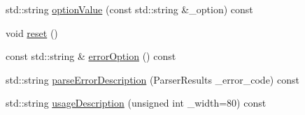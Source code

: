 \begin{DoxyCompactItemize}
$$\item 
std\-::string \hyperlink{class_command_line_processing_1_1_argv_parser_a06a1650620c759ffb8972d18fba385bb}{option\-Value} (const std\-::string \&\-\_\-option) const 
\item 
void \hyperlink{class_command_line_processing_1_1_argv_parser_aefecca97fb5a003dbcd88c4bfe02ffc7}{reset} ()
\item 
const std\-::string \& \hyperlink{class_command_line_processing_1_1_argv_parser_a84a1eb0e84ac35d4fffaf6a8464b733e}{error\-Option} () const 
\item 
std\-::string \hyperlink{class_command_line_processing_1_1_argv_parser_aed713ca71c7f5700f0fc554d97f63d81}{parse\-Error\-Description} (Parser\-Results \-\_\-error\-\_\-code) const 
\item 
std\-::string \hyperlink{class_command_line_processing_1_1_argv_parser_a3de10de9b05caa7b753545ce04891866}{usage\-Description} (unsigned int \-\_\-width=80) const 
\end{DoxyCompactItemize}


